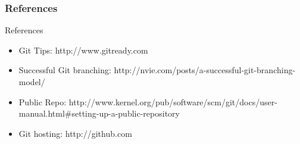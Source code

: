 \documentclass[10pt]{beamer}
\begin{document}
\begin{frame}
    \frametitle{References}
    \begin{block}{References}
        \begin{itemize}
            \item Git Tips: http://www.gitready.com
            \item Successful Git branching: http://nvie.com/posts/a-successful-git-branching-model/
            \item Public Repo: http://www.kernel.org/pub/software/scm/git/docs/user-manual.html\#setting-up-a-public-repository
            \item Git hosting: http://github.com
        \end{itemize}
    \end{block}
\end{frame}
\end{document}
